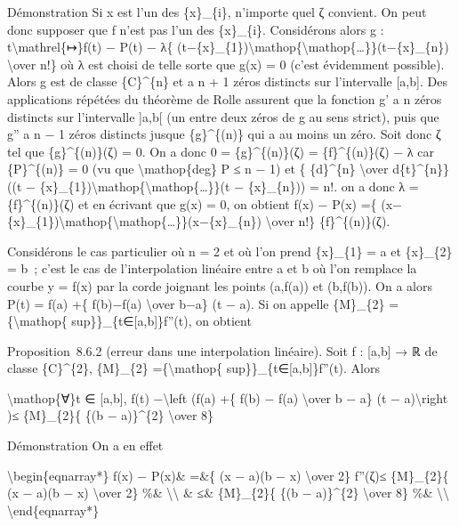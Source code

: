 \documentclass[]{article}
\begin{document}
Démonstration Si x est l'un des \{x\}\_\{i\}, n'importe quel ζ convient.
On peut donc supposer que f n'est pas l'un des \{x\}\_\{i\}. Considérons
alors g : t\textbackslash{}mathrel\{↦\}f(t) − P(t) − λ\{
(t−\{x\}\_\{1\})\textbackslash{}mathop\{\textbackslash{}mathop\{\ldots{}\}\}(t−\{x\}\_\{n\})
\textbackslash{}over n!\} où λ est choisi de telle sorte que g(x) = 0
(c'est évidemment possible). Alors g est de classe \{C\}\^{}\{n\} et a n
+ 1 zéros distincts sur l'intervalle {[}a,b{]}. Des applications
répétées du théorème de Rolle assurent que la fonction g' a n zéros
distincts sur l'intervalle {]}a,b{[} (un entre deux zéros de g au sens
strict), puis que g'' a n − 1 zéros distincts jusque \{g\}\^{}\{(n)\}
qui a au moins un zéro. Soit donc ζ tel que \{g\}\^{}\{(n)\}(ζ) = 0. On
a donc 0 = \{g\}\^{}\{(n)\}(ζ) = \{f\}\^{}\{(n)\}(ζ) − λ car
\{P\}\^{}\{(n)\} = 0 (vu que \textbackslash{}mathop\{deg\} P ≤ n − 1) et
\{ \{d\}\^{}\{n\} \textbackslash{}over d\{t\}\^{}\{n\}\} ((t −
\{x\}\_\{1\})\textbackslash{}mathop\{\textbackslash{}mathop\{\ldots{}\}\}(t
− \{x\}\_\{n\})) = n!. on a donc λ = \{f\}\^{}\{(n)\}(ζ) et en écrivant
que g(x) = 0, on obtient f(x) − P(x) =\{
(x−\{x\}\_\{1\})\textbackslash{}mathop\{\textbackslash{}mathop\{\ldots{}\}\}(x−\{x\}\_\{n\})
\textbackslash{}over n!\} \{f\}\^{}\{(n)\}(ζ).

Considérons le cas particulier où n = 2 et où l'on prend \{x\}\_\{1\} =
a et \{x\}\_\{2\} = b~; c'est le cas de l'interpolation linéaire entre a
et b où l'on remplace la courbe y = f(x) par la corde joignant les
points (a,f(a)) et (b,f(b)). On a alors P(t) = f(a) +\{ f(b)−f(a)
\textbackslash{}over b−a\} (t − a). Si on appelle \{M\}\_\{2\}
=\{\textbackslash{}mathop\{
sup\}\}\_\{t∈{[}a,b{]}\}\textbar{}f''(t)\textbar{}, on obtient

Proposition~8.6.2 (erreur dans une interpolation linéaire). Soit f :
{[}a,b{]} → ℝ de classe \{C\}\^{}\{2\}, \{M\}\_\{2\}
=\{\textbackslash{}mathop\{
sup\}\}\_\{t∈{[}a,b{]}\}\textbar{}f''(t)\textbar{}. Alors

\textbackslash{}mathop\{∀\}t ∈ {[}a,b{]}, \textbar{}f(t)
−\textbackslash{}left (f(a) +\{ f(b) − f(a) \textbackslash{}over b − a\}
(t − a)\textbackslash{}right )\textbar{}≤ \{M\}\_\{2\}\{ \{(b −
a)\}\^{}\{2\} \textbackslash{}over 8\}

Démonstration On a en effet

\textbackslash{}begin\{eqnarray*\} \textbar{}f(x) − P(x)\textbar{}\&
=\&\{ (x − a)(b − x) \textbackslash{}over 2\}
\textbar{}f''(ζ)\textbar{}≤ \{M\}\_\{2\}\{ (x − a)(b − x)
\textbackslash{}over 2\} \%\& \textbackslash{}\textbackslash{} \& ≤\&
\{M\}\_\{2\}\{ \{(b − a)\}\^{}\{2\} \textbackslash{}over 8\} \%\&
\textbackslash{}\textbackslash{} \textbackslash{}end\{eqnarray*\}
\end{document}
